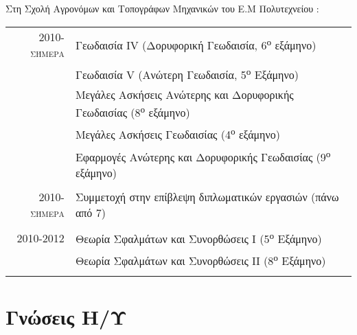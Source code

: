 \documentclass[a4paper,10pt]{article} %
\begin{document}
Στη Σχολή Αγρονόμων και Τοπογράφων Μηχανικών του Ε.Μ Πολυτεχνείου :

\begin{longtable}{rl}

\textsc{2010-σήμερα} & 
  Γεωδαισία IV (Δορυφορική Γεωδαισία, 6\textsuperscript{ο} εξάμηνο)\\
  & Γεωδαισία V (Ανώτερη Γεωδαισία, 5\textsuperscript{ο} Εξάμηνο)\\
  & Μεγάλες Ασκήσεις Ανώτερης και Δορυφορικής Γεωδαισίας (8\textsuperscript{ο} εξάμηνο)\\
  & Μεγάλες Ασκήσεις Γεωδαισίας (4\textsuperscript{ο} εξάμηνο)\\
  & Εφαρμογές Ανώτερης και Δορυφορικής Γεωδαισίας (9\textsuperscript{ο} εξάμηνο)\\
&\\

\textsc{2010-σήμερα} & 
  Συμμετοχή στην επίβλεψη διπλωματικών εργασιών (πάνω από 7)\\
&\\

\textsc{2010-2012} & 
  Θεωρία Σφαλμάτων και Συνορθώσεις Ι (5\textsuperscript{ο} Εξάμηνο)\\
  & Θεωρία Σφαλμάτων και Συνορθώσεις ΙΙ (8\textsuperscript{ο} Εξάμηνο)\\
&\\

\end{longtable}
\medskip

\section{Γνώσεις Η/Υ}
\end{document}
